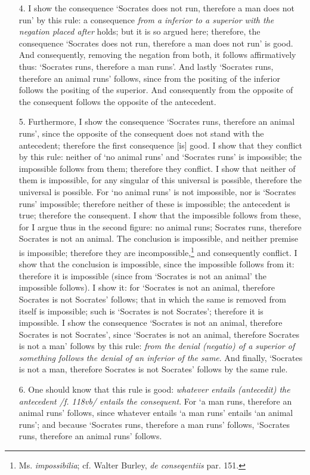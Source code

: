 \documentclass[]{article}
\begin{document}
\begin{enumerate}
\item[4.] I show the consequence `Socrates does not run, therefore a man does not run' by this rule: a consequence \textit{from a inferior to a superior with the negation placed after} holds; but it is so argued here; therefore, the consequence `Socrates does not run, therefore a man does not run' is good. And consequently, removing the negation from both, it follows affirmatively thus: `Socrates runs, therefore a man runs'. And lastly `Socrates runs, therefore an animal runs' follows, since from the positing of the inferior follows the positing of the superior. And consequently from the opposite of the consequent follows the opposite of the antecedent.
\item[5.] Furthermore, I show the consequence `Socrates runs, therefore an animal runs', since the opposite of the consequent does not stand with the antecedent; therefore the first consequence [is] good. I show that they conflict by this rule: neither of `no animal runs' and `Socrates runs' is impossible; the impossible follows from them; therefore they conflict. I show that neither of them is impossible, for any singular of this universal is possible, therefore the universal is possible. For `no animal runs' is not impossible, nor is `Socrates runs' impossible; therefore neither of these is impossible; the antecedent is true; therefore the consequent. I show that the impossible follows from these, for I argue thus in the second figure: no animal runs; Socrates runs, therefore Socrates is not an animal. The conclusion is impossible, and neither premise is impossible; therefore they are incompossible,\footnote{Ms. \textit{impossibilia}; cf. Walter Burley, \textit{de conseqentiis} par. 151.} and consequently conflict. I show that the conclusion is impossible, since the impossible follows from it: therefore it is impossible (since from `Socrates is not an animal' the impossible follows). I show it: for `Socrates is not an animal, therefore Socrates is not Socrates' follows; that in which the same is removed from itself is impossible; such is `Socrates is not Socrates'; therefore it is impossible. I show the consequence `Socrates is not an animal, therefore Socrates is not Socrates', since `Socrates is not an animal, therefore Socrates is not a man' follows by this rule: \textit{from the denial (negatio) of a superior of something follows the denial of an inferior of the same}. And finally, `Socrates is not a man, therefore Socrates is not Socrates' follows by the same rule.
\item[6.] One should know that this rule is good: \textit{whatever entails (antecedit) the antecedent /f. 118vb/ entails the consequent}. For `a man runs, therefore an animal runs' follows, since whatever entails `a man runs' entails `an animal runs'; and because `Socrates runs, therefore a man runs' follows, `Socrates runs, therefore an animal runs' follows.

\end{enumerate}
\end{document}
